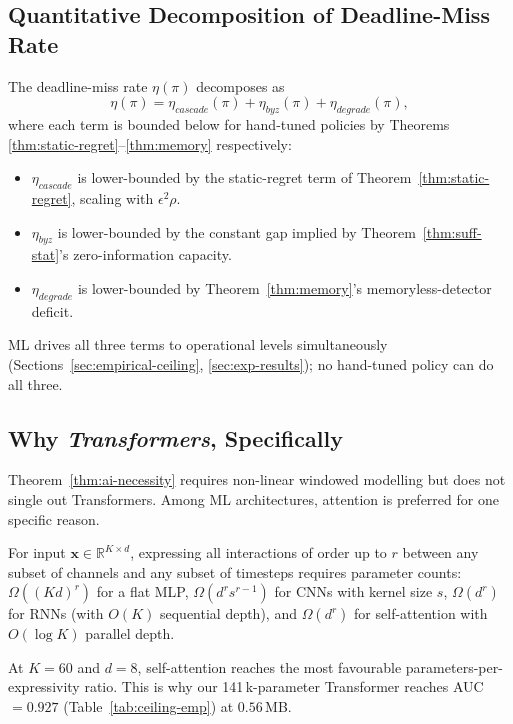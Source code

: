 \subsection{Quantitative Decomposition of Deadline-Miss Rate}

The deadline-miss rate $\eta(\pi)$ decomposes as
\begin{equation}
  \eta(\pi) = \eta_{cascade}(\pi) + \eta_{byz}(\pi) + \eta_{degrade}(\pi),
\end{equation}
where each term is bounded below for hand-tuned policies by Theorems
\ref{thm:static-regret}--\ref{thm:memory} respectively:
\begin{itemize}\setlength\itemsep{1pt}
\item $\eta_{cascade}$ is lower-bounded by the static-regret term of
Theorem~\ref{thm:static-regret}, scaling with $\epsilon^2 \rho$.
\item $\eta_{byz}$ is lower-bounded by the constant gap implied by
Theorem~\ref{thm:suff-stat}'s zero-information capacity.
\item $\eta_{degrade}$ is lower-bounded by Theorem~\ref{thm:memory}'s
memoryless-detector deficit.
\end{itemize}
ML drives all three terms to operational levels simultaneously
(Sections~\ref{sec:empirical-ceiling}, \ref{sec:exp-results}); no
hand-tuned policy can do all three.

\subsection{Why \emph{Transformers}, Specifically}

Theorem~\ref{thm:ai-necessity} requires non-linear windowed
modelling but does not single out Transformers. Among ML
architectures, attention is preferred for one specific reason.

\begin{proposition}
\label{prop:attn-eff}
For input $\mathbf{x} \in \mathbb{R}^{K \times d}$, expressing all
interactions of order up to $r$ between any subset of channels and any
subset of timesteps requires parameter counts:
$\Omega((Kd)^r)$ for a flat MLP, $\Omega(d^r s^{r-1})$ for CNNs
with kernel size $s$, $\Omega(d^r)$ for RNNs (with $O(K)$ sequential
depth), and $\Omega(d^r)$ for self-attention with $O(\log K)$ parallel
depth.
\end{proposition}

At $K{=}60$ and $d{=}8$, self-attention reaches the most favourable
parameters-per-expressivity ratio. This is why our 141\,k-parameter
Transformer reaches AUC$=0.927$ (Table~\ref{tab:ceiling-emp}) at
$0.56$\,MB.

